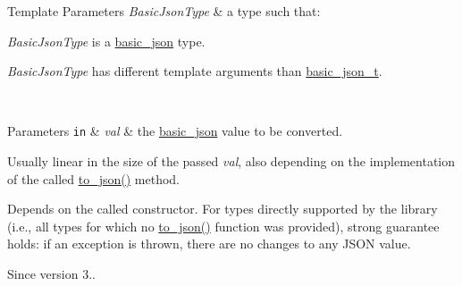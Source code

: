 \begin{DoxyTemplParams}{Template Parameters}
{\em Basic\+Json\+Type} & a type such that\+:
\begin{DoxyItemize}
\item {\itshape Basic\+Json\+Type} is a \hyperlink{classnlohmann_1_1basic__json}{basic\+\_\+json} type.
\item {\itshape Basic\+Json\+Type} has different template arguments than \hyperlink{classnlohmann_1_1basic__json_a125c0afa5f3599949b0589ef7b4aa322}{basic\+\_\+json\+\_\+t}.
\end{DoxyItemize}\\
\hline
\end{DoxyTemplParams}

\begin{DoxyParams}[1]{Parameters}
\mbox{\tt in}  & {\em val} & the \hyperlink{classnlohmann_1_1basic__json}{basic\+\_\+json} value to be converted.\\
\hline
\end{DoxyParams}
Usually linear in the size of the passed {\itshape val}, also depending on the implementation of the called {\ttfamily \hyperlink{namespacenlohmann_1_1detail_aaa77b0c9745130b77733a92a1a2e82ec}{to\+\_\+json()}} method.

Depends on the called constructor. For types directly supported by the library (i.\+e., all types for which no {\ttfamily \hyperlink{namespacenlohmann_1_1detail_aaa77b0c9745130b77733a92a1a2e82ec}{to\+\_\+json()}} function was provided), strong guarantee holds\+: if an exception is thrown, there are no changes to any J\+S\+ON value.

\begin{DoxySince}{Since}
version 3.. 
\end{DoxySince}
